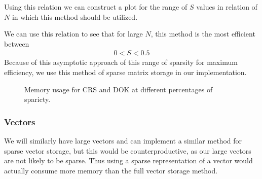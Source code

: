 \documentclass[../fem.tex]{subfile}
\begin{document}
Using this relation we can construct a plot for the range of $S$ values in
relation of $N$ in which this method should be utilized.


We can use this relation to see that for large $N$, this method is the most
efficient between
\begin{align*}
  0 < S < 0.5
\end{align*}
Because of this asymptotic approach of this range of sparsity for maximum
efficiency, we use this method of sparse matrix storage in our implementation.

\begin{figure}[htpb]
  \centering
  \caption{Memory usage for CRS and DOK at different percentages of
  sparicty.}
  \label{fig:mat_CRS}
\end{figure}

\subsubsection{Vectors}%
\label{ssub:vectors}

We will similarly have large vectors and can implement a similar method for
sparse vector storage, but this would be counterproductive, as our large
vectors are not likely to be sparse. Thus using a sparse representation of a
vector would actually consume more memory than the full vector storage method.
\end{document}
